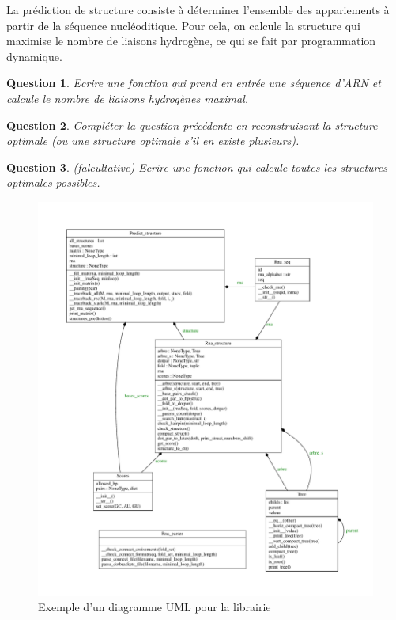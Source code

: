 \documentclass[10pt]{article}
\newtheorem{question}{Question}
\begin{document}
 La prédiction de structure consiste à déterminer l'ensemble des appariements à partir de la séquence nucléoditique. Pour cela, on calcule la structure qui maximise le nombre de liaisons hydrogène, ce qui se fait par programmation dynamique.
  
 \begin{question}
   Ecrire une fonction qui prend en entrée une séquence d'ARN et calcule le nombre
   de liaisons hydrogènes maximal.
  \end{question}

\begin{question}
  Compléter la question précédente en reconstruisant la structure optimale (ou une structure optimale s'il en existe plusieurs).
\end{question}


\begin{question}(falcultative)
Ecrire une fonction qui calcule toutes les structures optimales possibles.
\end{question}

\begin{figure}
\includegraphics[width=\textwidth]{Rnalib.pdf}
\caption{Exemple d'un diagramme UML pour la librairie}
\label{fig:uml}
\end{figure}
\end{document}
